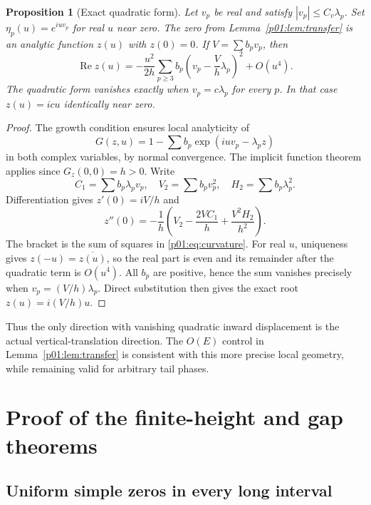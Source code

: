 \documentclass[11pt,letterpaper]{article}
\newtheorem{proposition}[theorem]{Proposition}
\theoremstyle{definition}
\theoremstyle{remark}
\newcommand{\Ree}{\operatorname{Re}}
\newcommand{\1}{\mathbf 1}
\begin{document}
\begin{proposition}[Exact quadratic form]\label{p01:prop:curvature}
Let $v_p$ be real and satisfy $|v_p|\le C_v\lambda_p$. Set
$\eta_p(u)=e^{iu v_p}$ for real $u$ near zero. The zero from
Lemma~\ref{p01:lem:transfer} is an analytic function $z(u)$ with $z(0)=0$.
If $V=\sum b_pv_p$, then
\begin{equation}\label{p01:eq:curvature}
 \Ree z(u)=-\frac{u^2}{2h}
    \sum_{p\ge3}b_p\left(v_p-\frac Vh\lambda_p\right)^2+O(u^4).
\end{equation}
The quadratic form vanishes exactly when $v_p=c\lambda_p$ for every
$p$. In that case $z(u)=icu$ identically near zero.
\end{proposition}
\begin{proof}
The growth condition ensures local analyticity of
\[
 G(z,u)=1-\sum b_p\exp(iuv_p-\lambda_p z)
\]
in both complex variables, by normal convergence. The implicit function
theorem applies since $G_z(0,0)=h>0$. Write
\[
 C_1=\sum b_p\lambda_pv_p,\quad V_2=\sum b_pv_p^2,
 \quad H_2=\sum b_p\lambda_p^2.
\]
Differentiation gives $z'(0)=iV/h$ and
\[
 z''(0)=-\frac1h\left(V_2-\frac{2VC_1}h
                                  +\frac{V^2H_2}{h^2}\right).
\]
The bracket is the sum of squares in \eqref{p01:eq:curvature}.
For real $u$, uniqueness gives $z(-u)=\overline{z(u)}$, so the real
part is even and its remainder after the quadratic term is $O(u^4)$.
All $b_p$ are positive, hence the sum vanishes precisely when
$v_p=(V/h)\lambda_p$. Direct substitution then gives the exact root
$z(u)=i(V/h)u$.
\end{proof}

Thus the only direction with vanishing quadratic inward displacement
is the actual vertical-translation direction. The $O(E)$ control in
Lemma~\ref{p01:lem:transfer} is consistent with this more precise local
geometry, while remaining valid for arbitrary tail phases.

\section{Proof of the finite-height and gap theorems}

\subsection{Uniform simple zeros in every long interval}
\end{document}
